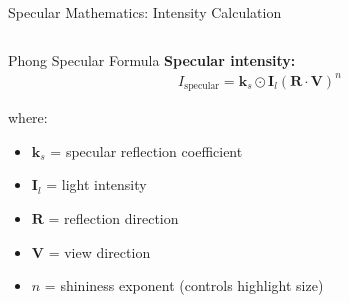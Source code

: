 \begin{frame}{Specular Mathematics: Intensity Calculation}
  \begin{columns}
    \begin{column}{0.6\textwidth}
      \begin{mathbox}{Phong Specular Formula}
        \textbf{Specular intensity:}
        \footnotesize
        \begin{align}
          I_{\text{specular}} = \mathbf{k}_s \odot \mathbf{I}_l  (\mathbf{R} \cdot \mathbf{V})^n
        \end{align}

        where:
        \begin{itemize}
          \item $\mathbf{k}_s$ = specular reflection coefficient
          \item $\mathbf{I}_l$ = light intensity
          \item $\mathbf{R}$ = reflection direction
          \item $\mathbf{V}$ = view direction
          \item $n$ = shininess exponent (controls highlight size)
        \end{itemize}


\end{mathbox}
\end{column}
\end{columns}
\end{frame}

